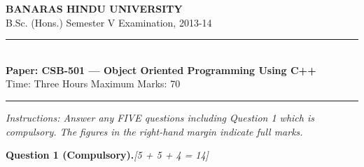 \documentclass[11pt,a4paper]{article}
\newcommand{\pts}[1]{\hfill   \textit{[#1]}}
\begin{document}
\begin{center}
  {\large\bfseries BANARAS HINDU UNIVERSITY}\\[2pt]
  {\normalsize B.Sc. (Hons.) Semester V Examination, 2013-14}\\[6pt]
  \rule{0.8\linewidth}{0.5pt}\\[6pt]
  {\large\bfseries Paper: CSB-501 --- Object Oriented Programming Using C++}\\[4pt]
  {\normalsize Time: Three Hours \hfill Maximum Marks: 70}
\end{center}

\rule{\linewidth}{0.4pt}

\smallskip



\noindent   \textit{Instructions: Answer any FIVE questions including Question 1 which is compulsory. The figures in the right-hand margin indicate full marks.}

\bigskip

\medskip


\noindent   \textbf{Question 1 (Compulsory).}\pts{5 + 5 + 4 = 14}
\end{document}
